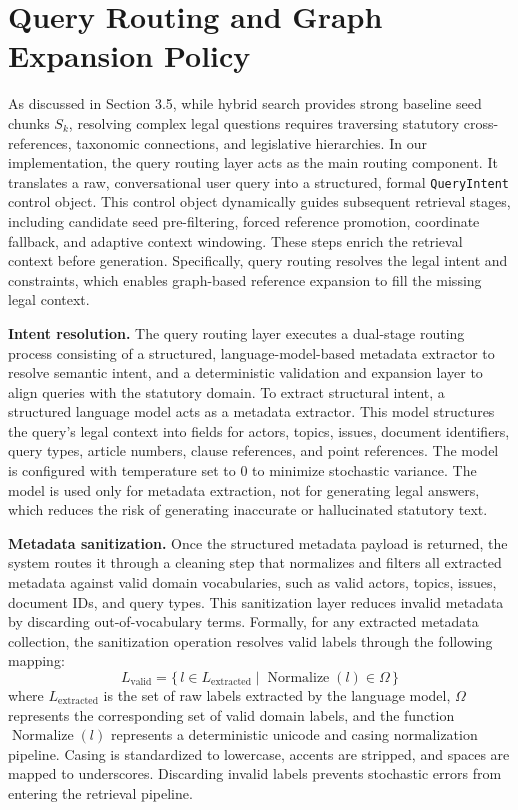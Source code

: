 \section{Query Routing and Graph Expansion Policy}

As discussed in Section 3.5, while hybrid search provides strong baseline seed chunks $S_k$, resolving complex legal questions requires traversing statutory cross-references, taxonomic connections, and legislative hierarchies. In our implementation, the query routing layer acts as the main routing component. It translates a raw, conversational user query into a structured, formal \texttt{QueryIntent} control object. This control object dynamically guides subsequent retrieval stages, including candidate seed pre-filtering, forced reference promotion, coordinate fallback, and adaptive context windowing. These steps enrich the retrieval context before generation. Specifically, query routing resolves the legal intent and constraints, which enables graph-based reference expansion to fill the missing legal context.

\textbf{Intent resolution.} The query routing layer executes a dual-stage routing process consisting of a structured, language-model-based metadata extractor to resolve semantic intent, and a deterministic validation and expansion layer to align queries with the statutory domain. To extract structural intent, a structured language model acts as a metadata extractor. This model structures the query's legal context into fields for actors, topics, issues, document identifiers, query types, article numbers, clause references, and point references. The model is configured with temperature set to 0 to minimize stochastic variance. The model is used only for metadata extraction, not for generating legal answers, which reduces the risk of generating inaccurate or hallucinated statutory text.

\textbf{Metadata sanitization.} Once the structured metadata payload is returned, the system routes it through a cleaning step that normalizes and filters all extracted metadata against valid domain vocabularies, such as valid actors, topics, issues, document IDs, and query types. This sanitization layer reduces invalid metadata by discarding out-of-vocabulary terms. Formally, for any extracted metadata collection, the sanitization operation resolves valid labels through the following mapping:
\[
L_{\mathrm{valid}} =
\{\, l \in L_{\mathrm{extracted}}
\mid \operatorname{Normalize}(l) \in \Omega \,\}
\]
where $L_{\mathrm{extracted}}$ is the set of raw labels extracted by the language model, $\Omega$ represents the corresponding set of valid domain labels, and the function $\operatorname{Normalize}(l)$ represents a deterministic unicode and casing normalization pipeline. Casing is standardized to lowercase, accents are stripped, and spaces are mapped to underscores. Discarding invalid labels prevents stochastic errors from entering the retrieval pipeline.

